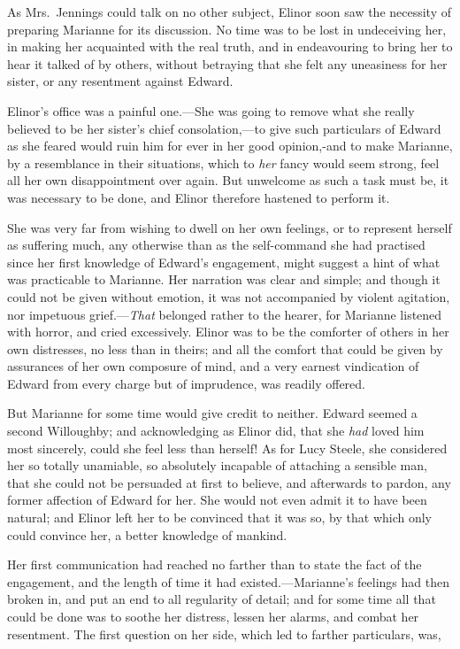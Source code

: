 \documentclass{article}
\begin{document}
As Mrs.\ Jennings could talk on no other subject,
Elinor soon saw the necessity of preparing Marianne for
its discussion.  No time was to be lost in undeceiving her,
in making her acquainted with the real truth, and in
endeavouring to bring her to hear it talked of by others,
without betraying that she felt any uneasiness for her sister,
or any resentment against Edward.

Elinor's office was a painful one.---She was going
to remove what she really believed to be her sister's
chief consolation,---to give such particulars of Edward as she
feared would ruin him for ever in her good opinion,-and
to make Marianne, by a resemblance in their situations,
which to \emph{her} fancy would seem strong, feel all her own
disappointment over again.  But unwelcome as such a task
must be, it was necessary to be done, and Elinor therefore
hastened to perform it.

She was very far from wishing to dwell on her own
feelings, or to represent herself as suffering much,
any otherwise than as the self-command she had practised
since her first knowledge of Edward's engagement, might
suggest a hint of what was practicable to Marianne.
Her narration was clear and simple; and though it could
not be given without emotion, it was not accompanied
by violent agitation, nor impetuous grief.---\emph{That} belonged
rather to the hearer, for Marianne listened with horror,
and cried excessively.  Elinor was to be the comforter
of others in her own distresses, no less than in theirs;
and all the comfort that could be given by assurances
of her own composure of mind, and a very earnest
vindication of Edward from every charge but of imprudence,
was readily offered.

But Marianne for some time would give credit to neither.
Edward seemed a second Willoughby; and acknowledging
as Elinor did, that she \emph{had} loved him most sincerely,
could she feel less than herself!  As for Lucy Steele,
she considered her so totally unamiable, so absolutely
incapable of attaching a sensible man, that she could
not be persuaded at first to believe, and afterwards
to pardon, any former affection of Edward for her.
She would not even admit it to have been natural;
and Elinor left her to be convinced that it was so,
by that which only could convince her, a better knowledge
of mankind.

Her first communication had reached no farther than
to state the fact of the engagement, and the length of time
it had existed.---Marianne's feelings had then broken in,
and put an end to all regularity of detail; and for some
time all that could be done was to soothe her distress,
lessen her alarms, and combat her resentment.  The first
question on her side, which led to farther particulars,
was,
\end{document}
